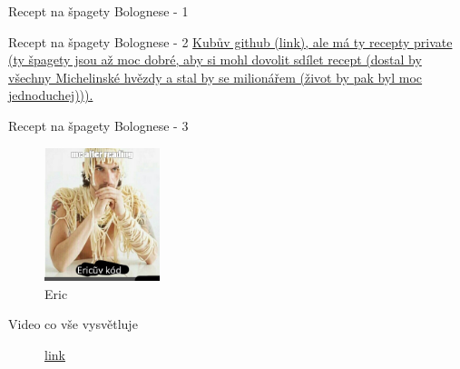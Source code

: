 \documentclass[aspectratio=169,xcolor=dvipsnames, t]{beamer}
\begin{document}
{\begin{frame}{Recept na špagety Bolognese - 1}
\end{frame}

\begin{frame}{Recept na špagety Bolognese - 2}
    \href{https://github.com/kubasim}{Kubův github (link), ale má ty recepty private (ty špagety jsou až moc dobré, aby si mohl dovolit sdílet recept (dostal by všechny Michelinské hvězdy a stal by se milionářem (život by pak byl moc jednoduchej))).}
\end{frame}
\begin{frame}{Recept na špagety Bolognese - 3}
    \begin{figure}
        \centering
         \includegraphics[width=0.30\textwidth]{obrazek}
        \caption{Eric} 
    \end{figure}
\end{frame}
\begin{frame}{Video co vše vysvětluje}
    \begin{figure}
        \href{https://www.youtube.com/watch?v=2lVDktWK-pc&pp=ygUhcHJvZ3JhbW1pbmcgbGFuZ3VhZ2VzIGZvciBkdW1taWVz}{link}
    \end{figure}
\end{frame}
}
\makefinalpage
\end{document}
